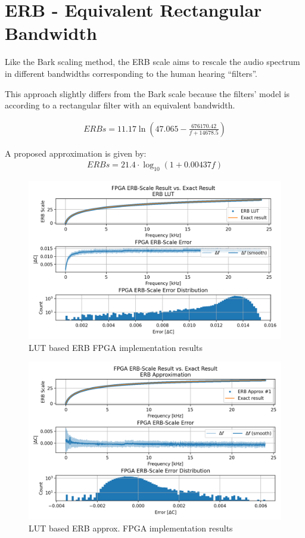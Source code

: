 \section{ERB - Equivalent Rectangular Bandwidth}
Like the Bark scaling method, the ERB scale aims 
to rescale the audio spectrum in different 
bandwidths corresponding to the human hearing ``filters''.

This approach slightly differs from the Bark scale
because the filters' model is according
to a rectangular filter with an equivalent
bandwidth.

\begin{align}\label{eq:erb_eq}
    ERBs = 11.17\ln (47.065 - \frac{676170.42}{f + 14678.5})    
\end{align}

A proposed approximation is given by:
\begin{align}\label{eq:erb_approx_eq}
    ERBs = 21.4 \cdot \log_{10} (1 + 0.00437f)    
\end{align}



\begin{figure}[H]
    \centering
    \includegraphics[width=0.75\linewidth]{Scaling/images/erb}
    \caption{LUT based ERB FPGA implementation results}\label{fig:erb_fpga}
\end{figure}


\begin{figure}[H]
    \centering
    \includegraphics[width=0.75\linewidth]{Scaling/images/erb_approx}
    \caption{LUT based ERB approx. FPGA implementation results}\label{fig:erb_approx}
\end{figure}


